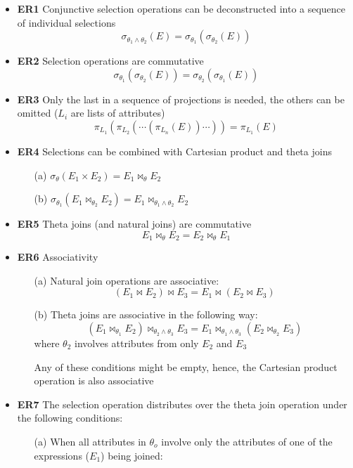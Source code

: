 \begin{itemize}[label=\(\rhd\)]
    \item \textbf{ER1} Conjunctive selection operations can be deconstructed into a sequence of individual selections\[
    \sigma_{\theta_1 \land \theta_2}(E) = \sigma_{\theta_1}(\sigma_{\theta_2}(E))
    \]
        \item \textbf{ER2} Selection operations are commutative \[
   \sigma_{\theta_1}(\sigma_{\theta_2}(E)) = \sigma_{\theta_2}(\sigma_{\theta_1}(E))
    \]
    \item \textbf{ER3} Only the last in a sequence of projections is needed, the others can be omitted ($L_i$ are lists of attributes) \[
    \pi_{L_1}(\pi_{L_2}(\cdots(\pi_{L_n}(E)) \cdots ))= \pi_{L_1}(E)
    \]
    \item \textbf{ER4} Selections can be combined with Cartesian product and theta joins
    \begin{itemize}[label=\(\rhd\)]
        \item[(a)] $\sigma_\theta(E_1 \times E_2) = E_1 \bowtie_\theta E_2$
        \item[(b)] $\sigma_{\theta_1}(E_1 \bowtie_{\theta_2}E_2)=E_1 \bowtie_{\theta_1 \land \theta_2} E_2$
    \end{itemize}
    \item \textbf{ER5} Theta joins (and natural joins) are commutative\[
    E_1 \bowtie_\theta E_2 = E_2 \bowtie_\theta E_1
    \]
    \item \textbf{ER6} Associativity
    \begin{itemize}[label=\(\rhd\)]
        \item[(a)] Natural join operations are associative: \[
        (E_1 \bowtie E_2) \bowtie E_3 = E_1 \bowtie (E_2\bowtie E_3)
        \]
        \item[(b)] Theta joins are associative in the following way:\[
        (E_1 \bowtie_{\theta_1}E_2) \bowtie_{\theta_2 \land \theta_3}E_3 = E_1 \bowtie_{\theta_1 \land \theta_3} (E_2 \bowtie_{\theta_2} E_3)
        \]
        where $\theta_2$ involves attributes from only $E_2$ and $E_3$
        \item[] Any of these conditions might be empty, hence, the Cartesian product operation is also associative
    \end{itemize}
    \item \textbf{ER7} The selection operation distributes over the theta join operation under the following conditions:
    \begin{itemize}[label=\(\rhd\)]
        \item[(a)] When all attributes in $\theta_o$ involve only the attributes of one of the expressions ($E_1$) being joined: \[
\]
\end{itemize}
\end{itemize}
